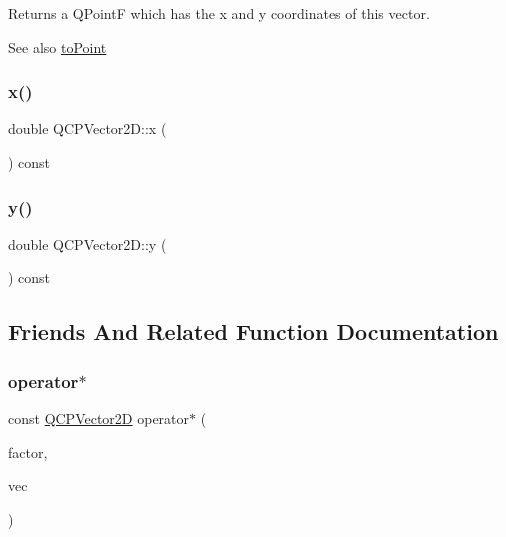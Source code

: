 Returns a Q\+PointF which has the x and y coordinates of this vector.

\begin{DoxySeeAlso}{See also}
\hyperlink{class_q_c_p_vector2_d_add3edf75de9b7bf1abc693b973b2e906}{to\+Point} 
\end{DoxySeeAlso}
\mbox{\label{class_q_c_p_vector2_d_a4a099e1f9788d52cb46deb8139aa6195}} 
\subsubsection{\texorpdfstring{x()}{x()}}
{\footnotesize\ttfamily double Q\+C\+P\+Vector2\+D\+::x (\begin{DoxyParamCaption}{ }\end{DoxyParamCaption}) const\hspace{0.3cm}{\ttfamily [inline]}}

\mbox{\label{class_q_c_p_vector2_d_a6398fb643ba380d7961a4b208f4eecf1}} 
\subsubsection{\texorpdfstring{y()}{y()}}
{\footnotesize\ttfamily double Q\+C\+P\+Vector2\+D\+::y (\begin{DoxyParamCaption}{ }\end{DoxyParamCaption}) const\hspace{0.3cm}{\ttfamily [inline]}}



\subsection{Friends And Related Function Documentation}
\mbox{\label{class_q_c_p_vector2_d_aa75268fb64b9eaee5448fb815007bee9}} 
\subsubsection{\texorpdfstring{operator$\ast$}{operator*}\hspace{0.1cm}{\footnotesize\ttfamily [1/2]}}
{\footnotesize\ttfamily const \hyperlink{class_q_c_p_vector2_d}{Q\+C\+P\+Vector2D} operator$\ast$ (\begin{DoxyParamCaption}\item[{double}]{factor,  }\item[{const \hyperlink{class_q_c_p_vector2_d}{Q\+C\+P\+Vector2D} \&}]{vec }\end{DoxyParamCaption})\hspace{0.3cm}{\ttfamily [friend]}}


